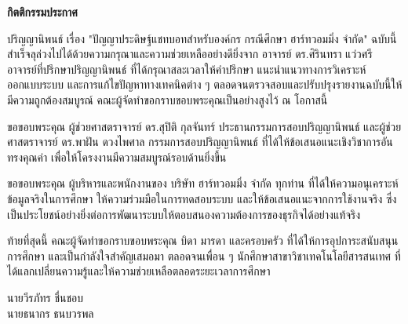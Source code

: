\vspace*{-0.5in}

\begin{center}\textbf{กิตติกรรมประกาศ}\end{center}
\vspace*{0.2in}

\hspace*{1.5em}ปริญญานิพนธ์ เรื่อง "ปัญญาประดิษฐ์แชทบอทสำหรับองค์กร กรณีศึกษา ฮาร์ทวอมมิ่ง จำกัด" ฉบับนี้ สำเร็จลุล่วงไปได้ด้วยความกรุณาและความช่วยเหลืออย่างดียิ่งจาก อาจารย์ ดร.ศิรินทรา แว่วศรี อาจารย์ที่ปรึกษาปริญญานิพนธ์ ที่ได้กรุณาสละเวลาให้คำปรึกษา แนะนำแนวทางการวิเคราะห์ ออกแบบระบบ และการแก้ไขปัญหาทางเทคนิคต่าง ๆ ตลอดจนตรวจสอบและปรับปรุงรายงานฉบับนี้ให้มีความถูกต้องสมบูรณ์ คณะผู้จัดทำขอกราบขอบพระคุณเป็นอย่างสูงไว้ ณ โอกาสนี้

\vspace{0.8em}
\hspace*{1.5em}ขอขอบพระคุณ ผู้ช่วยศาสตราจารย์ ดร.สุปิติ กุลจันทร์ ประธานกรรมการสอบปริญญานิพนธ์ และผู้ช่วยศาสตราจารย์ ดร.พาฝัน ดวงไพศาล กรรมการสอบปริญญานิพนธ์ ที่ได้ให้ข้อเสนอแนะเชิงวิชาการอันทรงคุณค่า เพื่อให้โครงงานมีความสมบูรณ์รอบด้านยิ่งขึ้น

\vspace{0.8em}
\hspace*{1.5em}ขอขอบพระคุณ ผู้บริหารและพนักงานของ บริษัท ฮาร์ทวอมมิ่ง จำกัด ทุกท่าน ที่ได้ให้ความอนุเคราะห์ข้อมูลจริงในการศึกษา ให้ความร่วมมือในการทดสอบระบบ และให้ข้อเสนอแนะจากการใช้งานจริง ซึ่งเป็นประโยชน์อย่างยิ่งต่อการพัฒนาระบบให้ตอบสนองความต้องการของธุรกิจได้อย่างแท้จริง

\vspace{0.8em}
\hspace*{1.5em}ท้ายที่สุดนี้ คณะผู้จัดทำขอกราบขอบพระคุณ บิดา มารดา และครอบครัว ที่ได้ให้การอุปการะสนับสนุนการศึกษา และเป็นกำลังใจสำคัญเสมอมา ตลอดจนเพื่อน ๆ นักศึกษาสาขาวิชาเทคโนโลยีสารสนเทศ ที่ได้แลกเปลี่ยนความรู้และให้ความช่วยเหลือตลอดระยะเวลาการศึกษา

\vspace{1.5cm}
\begin{flushright}
นายวีรภัทร ชื่นชอบ\\
นายธนากร ธนบวรพล
\end{flushright}
